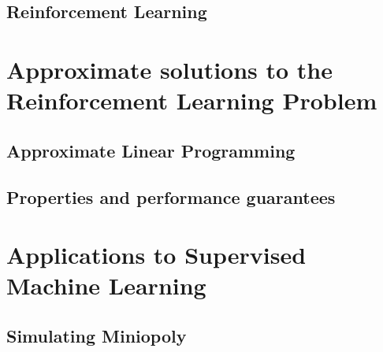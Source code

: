 \documentclass[colorful]{sty/itam-thesis}
\begin{document}
	\chapter{Reinforcement Learning}

\cleardoublepage
\part{Approximate solutions to the Reinforcement Learning 
Problem}

	\chapter{Approximate Linear Programming}
	

	\chapter{Properties and performance guarantees}
	


\cleardoublepage
\part{Applications to Supervised Machine Learning}
	\appendix

	\chapter{Simulating Miniopoly}

\nocite{*}
\cleardoublepage
\printbibliography
\end{document}
